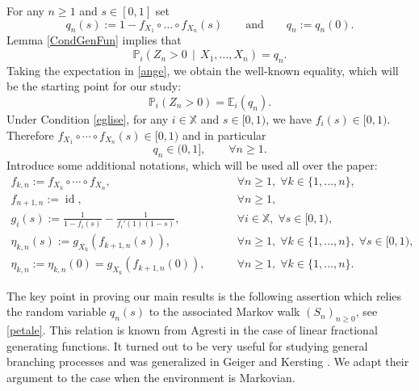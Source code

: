 \documentclass[12pt]{amsart}
\theoremstyle{definition}
\numberwithin{equation}{section}
\newcommand*{\sachant}[2]{\left.#1 \,\middle|\,#2\right.}
\def\bb#1{\mathbb{#1}}
\def\geq{\geqslant}
\DeclareMathOperator{\id}{id}
\begin{document}
For any $n \geq 1$ and $s\in [0,1]$ set
\begin{equation}
	\label{jeux}
	q_n(s) := 1- f_{X_1} \circ \dots \circ f_{X_n} (s) \qquad \text{and} \qquad q_n := q_n(0).
\end{equation}
Lemma \ref{CondGenFun} implies that
\begin{equation}
	\label{ange}
	\bb P_i \left( \sachant{Z_n > 0}{ X_1, \dots, X_{n} } \right) = q_n.
\end{equation}
Taking the expectation in \eqref{ange}, we obtain the  well-known equality, which will be the starting point for our study:
\begin{equation}
	\label{rose}
	\bb P_i \left( Z_n > 0\right) = \bb E_i \left( q_n \right).
\end{equation}
Under Condition \ref{eglise}, for any $i\in \bb X$ and $s\in [0,1)$, we have $f_i(s) \in [0,1)$. 
Therefore $f_{X_1} \circ \cdots \circ f_{X_n} (s) \in [0,1)$ and in particular
\begin{equation}
	\label{histoire}
	q_n \in (0,1], \qquad  \forall n \geq 1.
\end{equation}
Introduce some additional notations, which will be used all over the paper:
\begin{align}
	\label{montre001}
	 f_{k,n} := f_{X_k} \circ \cdots \circ f_{X_n}, &\qquad  \forall n \geq 1,\;  \forall k \in \{1,\dots,n\},\\
	\label{montre002}
	 f_{n+1,n} := \id, &\qquad   \forall n \geq 1, \\
	\label{montre003}
	g_i(s) := \frac{1}{1-f_i(s)} - \frac{1}{f_i'(1)(1-s)},  &\qquad   \forall i \in \bb X,\;  \forall s \in [0,1), \\
	\label{montre004}
	\eta_{k,n}(s) := g_{X_k} \left( f_{k+1,n}(s) \right), &\qquad  \forall n \geq 1,\;  \forall k \in \{1,\dots,n\},\;  \forall s \in [0,1), \\
	\label{montre005}
	\eta_{k,n} := \eta_{k,n}(0) = g_{X_k} \left( f_{k+1,n}(0) \right), &\qquad  \forall n \geq 1,\;  \forall k \in \{1,\dots,n\} .
\end{align}

The key point in proving our main results is the following assertion which relies the random variable $q_n(s)$ 
to the associated Markov walk $(S_n)_{n\geq 0}$, see \eqref{petale}. 
This relation is known from Agresti \cite{agresti_bounds_1974}  in the case of linear fractional generating functions.
It turned out to be very useful for studying general branching processes 
and was generalized in Geiger and Kersting \cite{geiger_survival_2001}. 
We adapt their argument to the case when the environment is Markovian.
\end{document}
